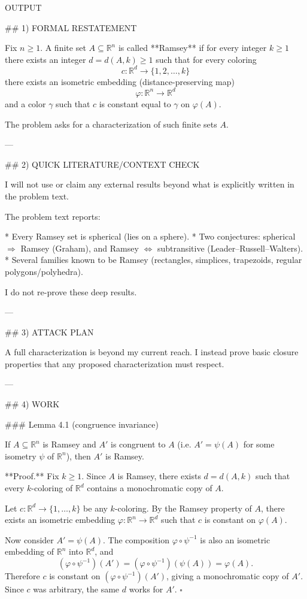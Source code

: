 OUTPUT

## 1) FORMAL RESTATEMENT

Fix $n\ge 1$.
A finite set $A\subseteq\mathbb R^n$ is called **Ramsey** if for every integer $k\ge 1$ there exists an integer $d=d(A,k)\ge 1$ such that for every coloring
\[
c:\mathbb R^d\to\{1,2,\dots,k\}
\]
there exists an isometric embedding (distance-preserving map)
\[
\varphi:\mathbb R^n\to\mathbb R^d
\]
and a color $\gamma$ such that $c$ is constant equal to $\gamma$ on $\varphi(A)$.

The problem asks for a characterization of such finite sets $A$.

---

## 2) QUICK LITERATURE/CONTEXT CHECK

I will not use or claim any external results beyond what is explicitly written in the problem text.

The problem text reports:

* Every Ramsey set is spherical (lies on a sphere).
* Two conjectures: spherical $\Rightarrow$ Ramsey (Graham), and Ramsey $\Leftrightarrow$ subtransitive (Leader–Russell–Walters).
* Several families known to be Ramsey (rectangles, simplices, trapezoids, regular polygons/polyhedra).

I do not re-prove these deep results.

---

## 3) ATTACK PLAN

A full characterization is beyond my current reach. I instead prove basic closure properties that any proposed characterization must respect.

---

## 4) WORK

### Lemma 4.1 (congruence invariance)

If $A\subseteq\mathbb R^n$ is Ramsey and $A'$ is congruent to $A$ (i.e. $A'=\psi(A)$ for some isometry $\psi$ of $\mathbb R^n$), then $A'$ is Ramsey.

**Proof.**
Fix $k\ge 1$.
Since $A$ is Ramsey, there exists $d=d(A,k)$ such that every $k$-coloring of $\mathbb R^d$ contains a monochromatic copy of $A$.

Let $c:\mathbb R^d\to\{1,\dots,k\}$ be any $k$-coloring.
By the Ramsey property of $A$, there exists an isometric embedding $\varphi:\mathbb R^n\to\mathbb R^d$ such that $c$ is constant on $\varphi(A)$.

Now consider $A'=\psi(A)$. The composition $\varphi\circ \psi^{-1}$ is also an isometric embedding of $\mathbb R^n$ into $\mathbb R^d$, and
\[
(\varphi\circ\psi^{-1})(A')=(\varphi\circ\psi^{-1})(\psi(A))=\varphi(A).
\]
Therefore $c$ is constant on $(\varphi\circ\psi^{-1})(A')$, giving a monochromatic copy of $A'$.
Since $c$ was arbitrary, the same $d$ works for $A'$.
$\square$


